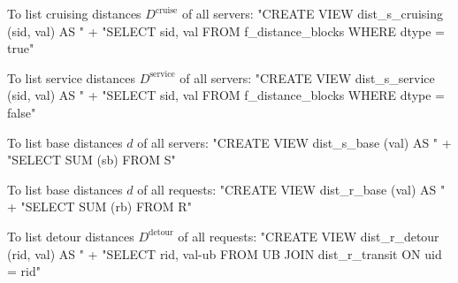 \documentclass{article}
\def\nwendcode{\endtrivlist \endgroup}
\let\nwdocspar=\par
\theoremstyle{definition}
\begin{document}
\nwendcode{}\nwdocspar
To list cruising distances $D^\textrm{cruise}$ of all servers:
\nwenddocs{}\endmoddef{}
"CREATE VIEW dist_s_cruising (sid, val) AS "
  + "SELECT sid, val FROM f_distance_blocks WHERE dtype = true"
\nwendcode{}\nwdocspar
To list service distances $D^\textrm{service}$ of all servers:
\nwenddocs{}\endmoddef{}
"CREATE VIEW dist_s_service (sid, val) AS "
  + "SELECT sid, val FROM f_distance_blocks WHERE dtype = false"
\nwendcode{}\nwdocspar
To list base distances $d$ of all servers:
\nwenddocs{}\endmoddef{}
"CREATE VIEW dist_s_base (val) AS "
  + "SELECT SUM (sb) FROM S"
\nwendcode{}\nwdocspar
To list base distances $d$ of all requests:
\nwenddocs{}\endmoddef{}
"CREATE VIEW dist_r_base (val) AS "
  + "SELECT SUM (rb) FROM R"
\nwendcode{}\nwdocspar
To list detour distances $D^\textrm{detour}$ of all requests:
\nwenddocs{}\endmoddef{}
"CREATE VIEW dist_r_detour (rid, val) AS "
  + "SELECT rid, val-ub FROM UB JOIN dist_r_transit ON uid = rid"
\nwendcode{}\nwdocspar
\end{document}
